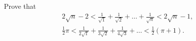Prove that
\begin{gather*}
2\sqrt{n} - 2
  < \frac{1}{\sqrt{1}} + \frac{1}{\sqrt{2}} + \dots + \frac{1}{\sqrt{n}}
  < 2\sqrt{n} - 1, \\
\tfrac{1}{2} \pi
  < \frac{1}{2\sqrt{1}} + \frac{1}{3\sqrt{2}} + \frac{1}{4\sqrt{3}} + \dots
  < \tfrac{1}{2}(\pi + 1).
\end{gather*}

